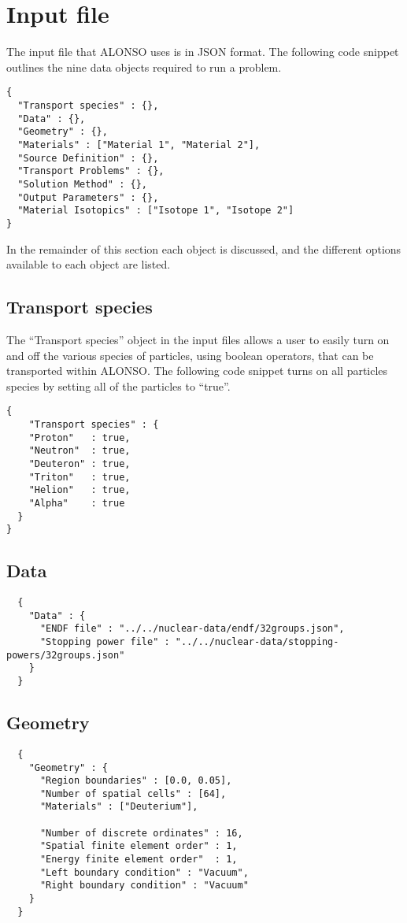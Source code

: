 \section{Input file}
The input file that ALONSO uses is in JSON format. The following code snippet outlines the nine data objects required to run a problem. 
\begin{verbatim}
{
  "Transport species" : {},
  "Data" : {},
  "Geometry" : {},
  "Materials" : ["Material 1", "Material 2"],
  "Source Definition" : {},
  "Transport Problems" : {},
  "Solution Method" : {},
  "Output Parameters" : {},
  "Material Isotopics" : ["Isotope 1", "Isotope 2"]
}
\end{verbatim}
In the remainder of this section each object is discussed, and the different options available to each object are listed.

\subsection{Transport species}
The ``Transport species'' object in the input files allows a user to easily turn on and off the various species of particles, using boolean operators, that can be transported within ALONSO. The following code snippet turns on all particles species by setting all of the particles to ``true''.
\begin{verbatim}
{
    "Transport species" : {
    "Proton"   : true,
    "Neutron"  : true,
    "Deuteron" : true,
    "Triton"   : true,
    "Helion"   : true,
    "Alpha"    : true
  }
}
\end{verbatim}

\subsection{Data}
\begin{verbatim}
  {
    "Data" : {
      "ENDF file" : "../../nuclear-data/endf/32groups.json",
      "Stopping power file" : "../../nuclear-data/stopping-powers/32groups.json"
    }
  }
\end{verbatim}

\subsection{Geometry}
\begin{verbatim}
  {
    "Geometry" : {
      "Region boundaries" : [0.0, 0.05],
      "Number of spatial cells" : [64],
      "Materials" : ["Deuterium"],

      "Number of discrete ordinates" : 16,
      "Spatial finite element order" : 1,
      "Energy finite element order"  : 1,
      "Left boundary condition" : "Vacuum",
      "Right boundary condition" : "Vacuum"
    }
  }
\end{verbatim}

